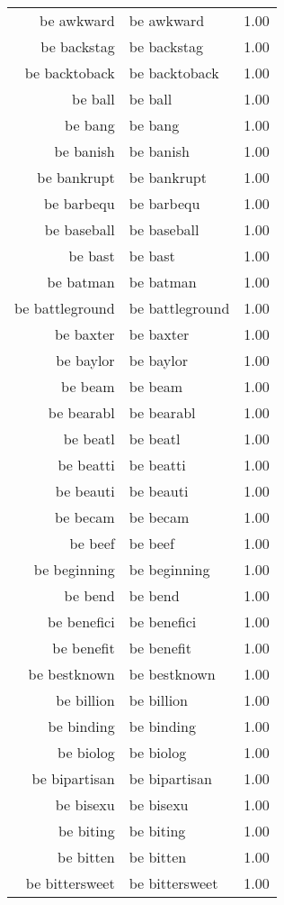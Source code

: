 \begin{table}[ht]
\begin{tabular}{rlr}
  be awkward & be awkward & 1.00 \\ 
  be backstag & be backstag & 1.00 \\ 
  be backtoback & be backtoback & 1.00 \\ 
  be ball & be ball & 1.00 \\ 
  be bang & be bang & 1.00 \\ 
  be banish & be banish & 1.00 \\ 
  be bankrupt & be bankrupt & 1.00 \\ 
  be barbequ & be barbequ & 1.00 \\ 
  be baseball & be baseball & 1.00 \\ 
  be bast & be bast & 1.00 \\ 
  be batman & be batman & 1.00 \\ 
  be battleground & be battleground & 1.00 \\ 
  be baxter & be baxter & 1.00 \\ 
  be baylor & be baylor & 1.00 \\ 
  be beam & be beam & 1.00 \\ 
  be bearabl & be bearabl & 1.00 \\ 
  be beatl & be beatl & 1.00 \\ 
  be beatti & be beatti & 1.00 \\ 
  be beauti & be beauti & 1.00 \\ 
  be becam & be becam & 1.00 \\ 
  be beef & be beef & 1.00 \\ 
  be beginning & be beginning & 1.00 \\ 
  be bend & be bend & 1.00 \\ 
  be benefici & be benefici & 1.00 \\ 
  be benefit & be benefit & 1.00 \\ 
  be bestknown & be bestknown & 1.00 \\ 
  be billion & be billion & 1.00 \\ 
  be binding & be binding & 1.00 \\ 
  be biolog & be biolog & 1.00 \\ 
  be bipartisan & be bipartisan & 1.00 \\ 
  be bisexu & be bisexu & 1.00 \\ 
  be biting & be biting & 1.00 \\ 
  be bitten & be bitten & 1.00 \\ 
  be bittersweet & be bittersweet & 1.00 \\ 

\end{tabular}
\end{table}
